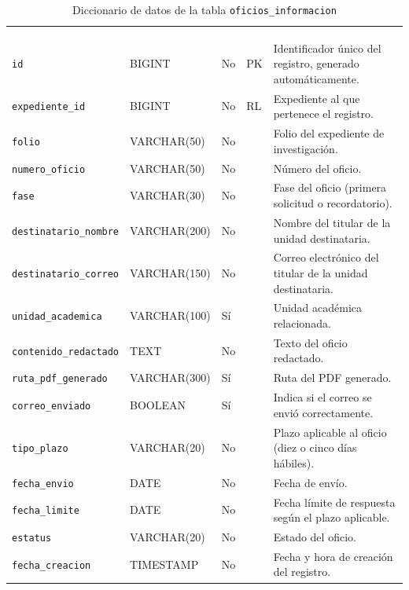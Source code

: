 \footnotesize
\renewcommand{\arraystretch}{1.15}
\setlength{\tabcolsep}{4pt}
\begin{longtable}{|L{3.9cm}|L{2.4cm}|L{0.9cm}|L{1.2cm}|L{6.6cm}|}
	\hiderowcolors\caption{Diccionario de datos de la tabla \texttt{oficios\_informacion}}
	\label{tab:dic_oficios_informacion} \\ \showrowcolors
	\hline
	 &  &  &  &  \\
	\hline
	\endfirsthead
	\hline
	 &  &  &  &  \\
	\hline
	\endhead
		\texttt{id} & BIGINT & No & PK & Identificador único del registro, generado automáticamente. \\ \hline
		\texttt{expediente\_\allowbreak{}id} & BIGINT & No & RL & Expediente al que pertenece el registro. \\ \hline
		\texttt{folio} & VARCHAR(50) & No &  & Folio del expediente de investigación. \\ \hline
		\texttt{numero\_\allowbreak{}oficio} & VARCHAR(50) & No &  & Número del oficio. \\ \hline
		\texttt{fase} & VARCHAR(30) & No &  & Fase del oficio (primera solicitud o recordatorio). \\ \hline
		\texttt{destinatario\_\allowbreak{}nombre} & VARCHAR(200) & No &  & Nombre del titular de la unidad destinataria. \\ \hline
		\texttt{destinatario\_\allowbreak{}correo} & VARCHAR(150) & No &  & Correo electrónico del titular de la unidad destinataria. \\ \hline
		\texttt{unidad\_\allowbreak{}academica} & VARCHAR(100) & Sí &  & Unidad académica relacionada. \\ \hline
		\texttt{contenido\_\allowbreak{}redactado} & TEXT & No &  & Texto del oficio redactado. \\ \hline
		\texttt{ruta\_\allowbreak{}pdf\_\allowbreak{}generado} & VARCHAR(300) & Sí &  & Ruta del PDF generado. \\ \hline
		\texttt{correo\_\allowbreak{}enviado} & BOOLEAN & Sí &  & Indica si el correo se envió correctamente. \\ \hline
		\texttt{tipo\_\allowbreak{}plazo} & VARCHAR(20) & No &  & Plazo aplicable al oficio (diez o cinco días hábiles). \\ \hline
		\texttt{fecha\_\allowbreak{}envio} & DATE & No &  & Fecha de envío. \\ \hline
		\texttt{fecha\_\allowbreak{}limite} & DATE & No &  & Fecha límite de respuesta según el plazo aplicable. \\ \hline
		\texttt{estatus} & VARCHAR(20) & No &  & Estado del oficio. \\ \hline
		\texttt{fecha\_\allowbreak{}creacion} & TIMESTAMP & No &  & Fecha y hora de creación del registro. \\ \hline
\end{longtable}
\normalsize
\setlength{\tabcolsep}{6pt}
\renewcommand{\arraystretch}{1}

